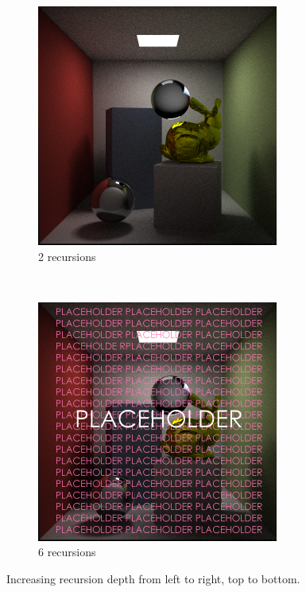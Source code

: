 \documentclass[a4paper, 12pt]{report}
\begin{document}
\begin{figure}
	\begin{subfigure}[h]{0.5\textwidth}
                \includegraphics[width=\textwidth]{figures/recursive_depth/recursion-3-100rpp.png}
                \caption{2 recursions}
                \label{fig:3rd}
        \end{subfigure}%
	~
	\begin{subfigure}[h]{0.5\textwidth}
                \includegraphics[width=\textwidth]{figures/recursive_depth/recursion-6-1000rppTMP.png}
                \caption{6 recursions}
                \label{fig:6rd}
        \end{subfigure}
        \caption{Increasing recursion depth from left to right, top to bottom.}\label{fig:recursion_depth}
\end{figure}
\end{document}
